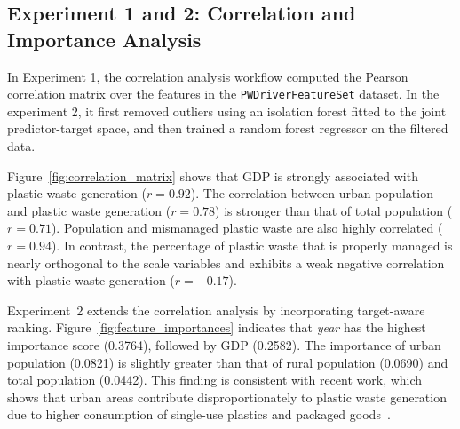 \subsection{Experiment 1 and 2: Correlation and Importance Analysis}

In Experiment 1, the correlation analysis workflow computed the Pearson correlation matrix over the features in the \texttt{PWDriverFeatureSet} dataset. In the experiment 2, it first removed outliers using an isolation forest fitted to the joint predictor-target space, and then trained a random forest regressor on the filtered data.



Figure~\ref{fig:correlation_matrix} shows that GDP is strongly associated with plastic waste generation (\(r = 0.92\)). The correlation between urban population and plastic waste generation (\(r = 0.78\)) is stronger than that of total population (\(r = 0.71\)). Population and mismanaged plastic waste are also highly correlated (\(r = 0.94\)). In contrast, the percentage of plastic waste that is properly managed is nearly orthogonal to the scale variables and exhibits a weak negative correlation with plastic waste generation (\(r = -0.17\)).



Experiment~2 extends the correlation analysis by incorporating target-aware ranking. Figure~\ref{fig:feature_importances} indicates that \textit{year} has the highest importance score (0.3764), followed by GDP (0.2582). The importance of urban population (0.0821) is slightly greater than that of rural population (0.0690) and total population (0.0442). This finding is consistent with recent work, which shows that urban areas contribute disproportionately to plastic waste generation due to higher consumption of single-use plastics and packaged goods~\cite{sen2026unveiling}.

